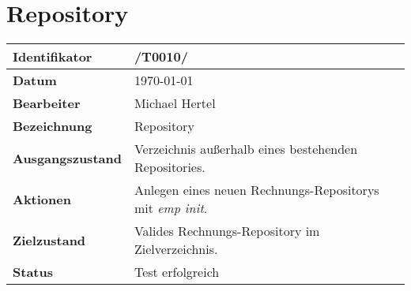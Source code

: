 
\section{Repository}

\renewcommand{\arraystretch}{1.5}

\begin{center}
 \begin{tabular}{|p{}|p{}|}
	\hline
	\textbf{Identifikator}  & /T0010/ \\
	\hline
	\textbf{Datum} & \today \\
	\hline
	\textbf{Bearbeiter} & Michael Hertel \\
	\hline
	\textbf{Bezeichnung} & Repository \\
	\hline
	\textbf{Ausgangszustand} &
		Verzeichnis außerhalb eines bestehenden Repositories. \\
	\hline
	\textbf{Aktionen} &
		Anlegen eines neuen Rechnungs-Repositorys mit \textit{emp init}. \\
	\hline
	\textbf{Zielzustand} &
		Valides Rechnungs-Repository im Zielverzeichnis. \\
	\hline
	\textbf{Status} & Test erfolgreich \\
	\hline
 \end{tabular}
\end{center}

